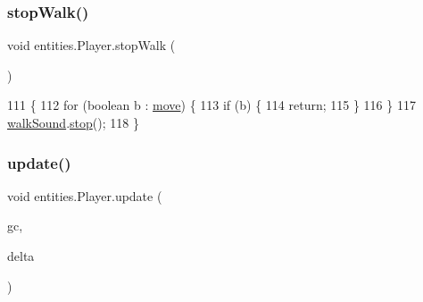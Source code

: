 \subsubsection{\texorpdfstring{stop\+Walk()}{stopWalk()}}
{\footnotesize\ttfamily void entities.\+Player.\+stop\+Walk (\begin{DoxyParamCaption}{ }\end{DoxyParamCaption})\hspace{0.3cm}{\ttfamily [inline]}}


\begin{DoxyCode}
111                            \{
112         \textcolor{keywordflow}{for} (\textcolor{keywordtype}{boolean} b : \mbox{\hyperlink{classentities_1_1_player_afbadbf8ec5ab49e6cbadb0d39f9ad6d1}{move}}) \{
113             \textcolor{keywordflow}{if} (b) \{
114                 \textcolor{keywordflow}{return};
115             \}
116         \}
117         \mbox{\hyperlink{classentities_1_1_player_a79a5a286c847ddeebb54102f66b009a0}{walkSound}}.\mbox{\hyperlink{classorg_1_1newdawn_1_1slick_1_1_sound_a92f5c4af5d3a5a0b26dcf3c6ebb93433}{stop}}();
118     \}
\end{DoxyCode}
\mbox{\label{classentities_1_1_player_abd693dd7c24c59d268906f115f9a4a3b}} 
\subsubsection{\texorpdfstring{update()}{update()}}
{\footnotesize\ttfamily void entities.\+Player.\+update (\begin{DoxyParamCaption}\item[{\mbox{\hyperlink{classorg_1_1newdawn_1_1slick_1_1_game_container}{Game\+Container}}}]{gc,  }\item[{long}]{delta }\end{DoxyParamCaption})\hspace{0.3cm}{\ttfamily [inline]}}



